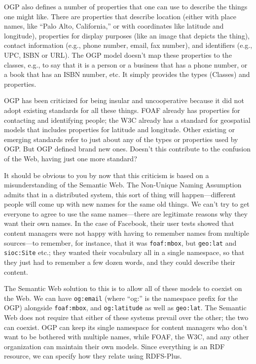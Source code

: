 OGP also defines a number of properties that one can use to describe the
things one might like. There are properties that describe location
(either with place names, like ``Palo Alto, California,'' or with
coordinates like latitude and longitude), properties for display
purposes (like an image that depicts the thing), contact information
(e.g., phone number, email, fax number), and identifiers (e.g., UPC,
ISBN or URL). The OGP model doesn't map these properties to the classes,
e.g., to say that it is a person or a business that has a phone number,
or a book that has an ISBN number, etc. It simply provides the types
(Classes) and properties.

OGP has been criticized for being insular and uncooperative because it
did not adopt existing
standards for all these things. FOAF already has properties for
contacting and identifying people; the W3C already has a standard for
geospatial models that includes properties for latitude and longitude.
Other existing or emerging standards refer to just about any of the
types or properties used by OGP. But OGP defined brand new ones. Doesn't
this contribute to the confusion of the Web, having just one more
standard?

It should be obvious to you by now that this criticism is based on a
misunderstanding of the Semantic Web. The Non-Unique Naming Assumption
admits that in a distributed system, this sort of thing will
happen---different people will come up with new names for the same old
things. We can't try to get everyone to agree to use the same
names---there are legitimate reasons why they want their own names. In
the case of Facebook, their user tests showed that content managers were
not happy with having to remember names from multiple sources---to
remember, for instance, that it was \texttt{foaf:mbox}, but \texttt{geo:lat} and \texttt{sioc:Site}
etc.; they wanted their vocabulary all in a single namespace, so that
they just had to remember a few dozen words, and they could describe
their content.

The Semantic Web solution to this is to allow all of these models to
coexist on the Web. We can have \texttt{og:email} (where ``og:'' is the namespace
prefix for the OGP) alongside \texttt{foaf:mbox}, and \texttt{og:latitude} as well as
\texttt{geo:lat}. The Semantic Web does not require that either of these systems
prevail over the other; the two can coexist. OGP can keep its single
namespace for content managers who don't want to be bothered with
multiple names, while FOAF, the W3C, and any other organization can
maintain their own models. Since everything is an RDF resource, we can
specify how they relate using RDFS-Plus.

